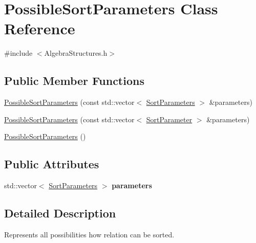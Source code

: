 \hypertarget{class_possible_sort_parameters}{\section{Possible\+Sort\+Parameters Class Reference}
\label{class_possible_sort_parameters}
}


{\ttfamily \#include $<$Algebra\+Structures.\+h$>$}

\subsection*{Public Member Functions}
\begin{DoxyCompactItemize}
\item 
\hyperlink{class_possible_sort_parameters_a08aad6763c347ad2a4dc2f20183efc24}{Possible\+Sort\+Parameters} (const std\+::vector$<$ \hyperlink{class_sort_parameters}{Sort\+Parameters} $>$ \&parameters)
\item 
\hyperlink{class_possible_sort_parameters_abf5abacee677c21a76de099cac60aa1a}{Possible\+Sort\+Parameters} (const std\+::vector$<$ \hyperlink{class_sort_parameter}{Sort\+Parameter} $>$ \&parameters)
\item 
\hyperlink{class_possible_sort_parameters_a0193033d9b018482a26f1501d489f4ba}{Possible\+Sort\+Parameters} ()
\end{DoxyCompactItemize}
\subsection*{Public Attributes}
\begin{DoxyCompactItemize}
\item 
\hypertarget{class_possible_sort_parameters_ac7cd94ff83acacceb9adee62c4228e7f}{std\+::vector$<$ \hyperlink{class_sort_parameters}{Sort\+Parameters} $>$ {\bfseries parameters}}\label{class_possible_sort_parameters_ac7cd94ff83acacceb9adee62c4228e7f}

\end{DoxyCompactItemize}


\subsection{Detailed Description}
Represents all possibilities how relation can be sorted. 


